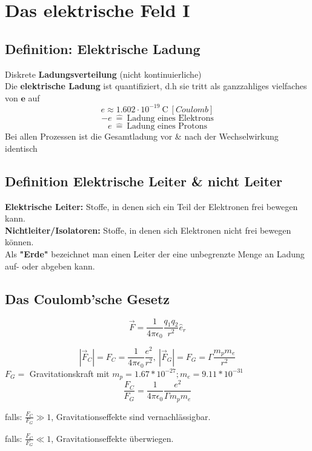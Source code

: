 \section{Das elektrische Feld I}
\begin{flushleft}
\subsection{Definition: Elektrische Ladung}
Diskrete \textbf{Ladungsverteilung} (nicht kontinuierliche)\\
Die \textbf{elektrische Ladung} ist quantifiziert, d.h sie tritt als ganzzahliges vielfaches von $\textbf{e}$ auf
\[
    e \approx 1.602 \cdot 10^{-19} \ \text{C} \: [Coulomb]
\]\[
	-e \: \hat{=} \ \text{Ladung eines Elektrons}
\]\[
	e \: \hat{=} \ \text{Ladung eines Protons}
\]
Bei allen Prozessen ist die Gesamtladung vor \& nach der Wechselwirkung identisch

\subsection{Definition Elektrische Leiter \& nicht Leiter}
\textbf{Elektrische Leiter:} Stoffe, in denen sich ein Teil der Elektronen frei bewegen kann. \\
\textbf{Nichtleiter/Isolatoren:} Stoffe, in denen sich Elektronen nicht frei bewegen können. \\
Als \textbf{"Erde"} bezeichnet man einen Leiter der eine unbegrenzte Menge an Ladung auf- oder abgeben kann.

\subsection{Das Coulomb'sche Gesetz}
\begin{formulabox}
    \[\Vec{F} = \frac{1}{4\pi\epsilon_0}\frac{q_1 q_2}{r^2}\hat{e}_r\]
\end{formulabox}
\[
	|\Vec{F}_C|=  F_C = \frac{1}{4\pi\epsilon_0}\frac{e^2}{r^2} ,\  
	|\Vec{F}_G|=  F_G = \Gamma\frac{m_p m_e}{r^2}
\]
$F_G = $ Gravitationskraft mit $m_p = 1.67*10^{-27} ; m_e = 9.11*10^{-31}$ \\
\[
	\frac{F_C}{F_G} = \frac{1}{4\pi\epsilon_0}\frac{e^2}{\Gamma m_p m_e}
\]

\hspace{5mm} falls: $\frac{F_C}{F_G} \gg 1$, Gravitationseffekte sind vernachlässigbar.

\hspace{5mm} falls: $\frac{F_C}{F_G} \ll 1$, Gravitationseffekte überwiegen.


\end{flushleft}
